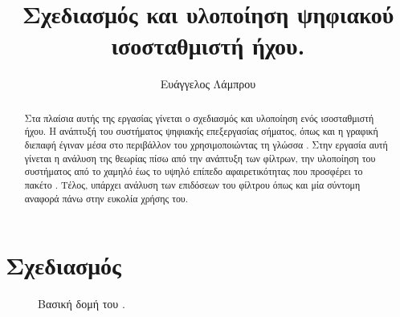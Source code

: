 \documentclass{article}
\begin{document}
\begin{titlepage}

\title{Σχεδιασμός και υλοποίηση ψηφιακού ισοσταθμιστή ήχου.}

\author{Ευάγγελος Λάμπρου}
\date{}

\maketitle


\begin{abstract}
    Στα πλαίσια αυτής της εργασίας γίνεται ο σχεδιασμός και υλοποίηση 
    ενός ισοσταθμιστή ήχου. 
    Η ανάπτυξή του συστήματος ψηφιακής επεξεργασίας σήματος, όπως 
    και η γραφική διεπαφή έγιναν μέσα στο περιβάλλον του 
     χρησιμοποιώντας τη γλώσσα . 
    Στην εργασία αυτή γίνεται η ανάλυση της θεωρίας πίσω από την ανάπτυξη των φίλτρων, 
    την υλοποίηση του συστήματος από το χαμηλό έως το υψηλό επίπεδο αφαιρετικότητας που 
    προσφέρει το πακέτο . 
    Τέλος, υπάρχει ανάλυση των επιδόσεων του φίλτρου όπως και μία σύντομη αναφορά πάνω 
    στην ευκολία χρήσης του.
\end{abstract}


\end{titlepage}

\linenumbers

\section{Σχεδιασμός}

\begin{figure}[htpb]

    \begin{center}

    \end{center}

    \caption{Βασική δομή του .} 
\end{figure}
\end{document}
